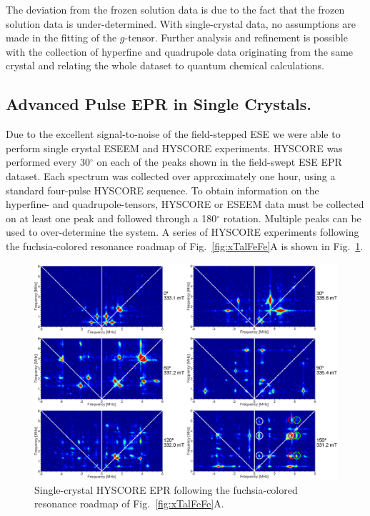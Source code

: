 The deviation from the frozen solution data is due to the fact that the frozen solution data is under-determined. With single-crystal data, no assumptions are made in the fitting of the $g$-tensor. Further analysis and refinement is possible with the collection of hyperfine and quadrupole data originating from the same crystal and relating the whole dataset to quantum chemical calculations.

\subsection{Advanced Pulse EPR in Single Crystals.}
Due to the excellent signal-to-noise of the field-stepped ESE we were able to perform single crystal ESEEM and HYSCORE experiments. HYSCORE was performed every 30$^{\circ}$ on each of the peaks shown in the field-swept ESE EPR dataset. Each spectrum was collected over approximately one hour, using a standard four-pulse HYSCORE sequence. \cite{schweiger2001principles} To obtain information on the hyperfine- and quadrupole-tensors, HYSCORE or ESEEM data must be collected on at least one peak and followed through a 180$^{\circ}$ rotation. Multiple peaks can be used to over-determine the system. A series of HYSCORE experiments following the fuchsia-colored resonance roadmap of Fig.~\ref{fig:xTalFeFe}A is shown in Fig.~\ref{fig:FeFeHYSCOREFollow}. 

\begin{figure}[ht]
\centering
 \includegraphics[width=\textwidth]{Kapitel/Ch5-Images/FeFe-FollowHyscore.eps}
 \caption[Single-crystal HYSCORE EPR following a single peak.]{Single-crystal HYSCORE EPR following the fuchsia-colored resonance roadmap of Fig.~\ref{fig:xTalFeFe}A.} \label{fig:FeFeHYSCOREFollow}
\end{figure}

